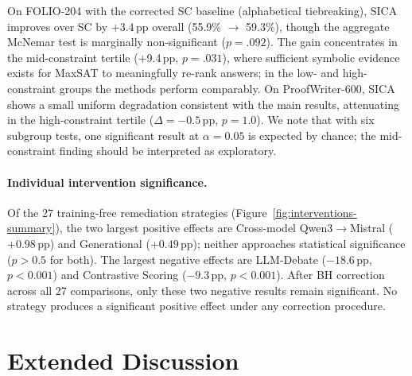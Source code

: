 On FOLIO-204 with the corrected SC baseline (alphabetical tiebreaking), SICA improves over SC by $+$3.4\,pp overall (55.9\% $\to$ 59.3\%), though the aggregate McNemar test is marginally non-significant ($p{=}.092$).
The gain concentrates in the mid-constraint tertile ($+$9.4\,pp, $p{=}.031$), where sufficient symbolic evidence exists for MaxSAT to meaningfully re-rank answers; in the low- and high-constraint groups the methods perform comparably.
On ProofWriter-600, SICA shows a small uniform degradation consistent with the main results, attenuating in the high-constraint tertile ($\Delta{=}{-}0.5$\,pp, $p{=}1.0$).
We note that with six subgroup tests, one significant result at $\alpha{=}0.05$ is expected by chance; the mid-constraint finding should be interpreted as exploratory.

\paragraph{Individual intervention significance.}
\label{app:intervention-individual}
Of the 27 training-free remediation strategies (Figure~\ref{fig:interventions-summary}), the two largest positive effects are Cross-model Qwen3$\to$Mistral ($+0.98$\,pp) and Generational ($+0.49$\,pp); neither approaches statistical significance ($p > 0.5$ for both). The largest negative effects are LLM-Debate ($-18.6$\,pp, $p < 0.001$) and Contrastive Scoring ($-9.3$\,pp, $p < 0.001$). After BH correction across all 27 comparisons, only these two negative results remain significant. No strategy produces a significant positive effect under any correction procedure.

\section{Extended Discussion}
\label{app:extended-discussion}
\label{app:limitations-extended}
\label{app:per-trace-separation}


